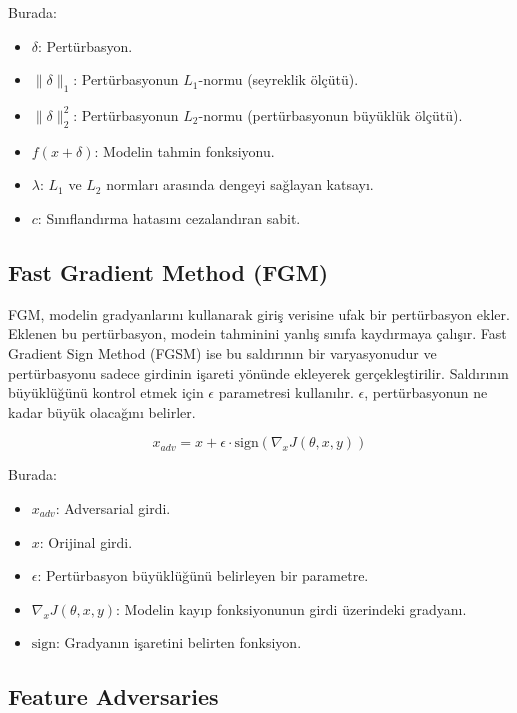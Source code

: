 Burada:

\begin{itemize}
    \item $\delta$: Pertürbasyon.
    \item $\|\delta\|_1$: Pertürbasyonun $L_1$-normu (seyreklik ölçütü).
    \item $\|\delta\|_2^2$: Pertürbasyonun $L_2$-normu (pertürbasyonun büyüklük ölçütü).
    \item $f(x + \delta)$: Modelin tahmin fonksiyonu.
    \item $\lambda$: $L_1$ ve $L_2$ normları arasında dengeyi sağlayan katsayı.
    \item $c$: Sınıflandırma hatasını cezalandıran sabit.
\end{itemize}

\newpage

\subsection{Fast Gradient Method (FGM)}

FGM, modelin gradyanlarını kullanarak giriş verisine ufak bir pertürbasyon ekler. Eklenen bu pertürbasyon, modein tahminini yanlış sınıfa kaydırmaya çalışır. Fast Gradient Sign Method (FGSM) ise bu saldırının bir varyasyonudur ve pertürbasyonu sadece girdinin işareti yönünde ekleyerek gerçekleştirilir. Saldırının büyüklüğünü kontrol etmek için $\epsilon$ parametresi kullanılır. $\epsilon$, pertürbasyonun ne kadar büyük olacağını belirler.

\[ x_{adv} = x + \epsilon \cdot \text{sign}(\nabla_x J(\theta, x, y)) \]

Burada:

\begin{itemize}
    \item $x_{adv}$: Adversarial girdi.
    \item $x$: Orijinal girdi.
    \item $\epsilon$: Pertürbasyon büyüklüğünü belirleyen bir parametre.
    \item $\nabla_x J(\theta, x, y)$: Modelin kayıp fonksiyonunun girdi üzerindeki gradyanı.
    \item $\text{sign}$: Gradyanın işaretini belirten fonksiyon.
\end{itemize}

\newpage

\subsection{Feature Adversaries}

